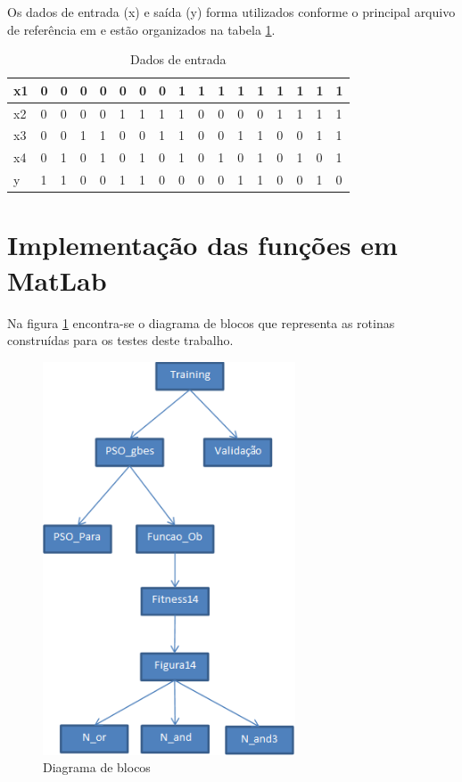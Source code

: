 \documentclass{IEEEtran}
\begin{document}
Os dados de entrada (x)  e saída (y) forma utilizados conforme o principal arquivo de referência em \cite{pedrycz2006or} e estão organizados na tabela \ref{tab}.

\begin{table}
  \centering
  \begin{tabular}{| l | l | l | l | l | l | l | l | l | l | l | l | l | l | l | l | l |}
  \hline
  x1	& 0	& 0	& 0	& 0	& 0	& 0	& 0	& 1	& 1	& 1	& 1	& 1	& 1	& 1	& 1	& 1 \\
	\hline
  x2	& 0	& 0	& 0	& 0	& 1	& 1	& 1	& 1	& 0	& 0	& 0	& 0	& 1	& 1	& 1	& 1 \\
	\hline
	x3	& 0	& 0	& 1	& 1	& 0	& 0	& 1	& 1	& 0	& 0	& 1	& 1	& 0	& 0	& 1	& 1 \\
	\hline
	x4	& 0	& 1	& 0	& 1	& 0	& 1	& 0	& 1	& 0	& 1	& 0	& 1	& 0	& 1	& 0	& 1 \\
	\hline
	y 	& 1	& 1	& 0	& 0	& 1	& 1	& 0	& 0	& 0	& 0	& 1	& 1	& 0	& 0	& 1	& 0 \\
  \hline
\end{tabular}
  \caption{Dados de entrada}
  \label{tab}
\end{table}

\section{Implementação das funções em MatLab}
Na figura \ref{dig} encontra-se o diagrama de blocos que representa as rotinas construídas para os testes deste trabalho.

\begin{figure}[ht!]
	\centering
	\includegraphics[width=75mm]{dig.png}
	\caption{Diagrama de blocos}
	\label{dig}
\end{figure}
\end{document}
